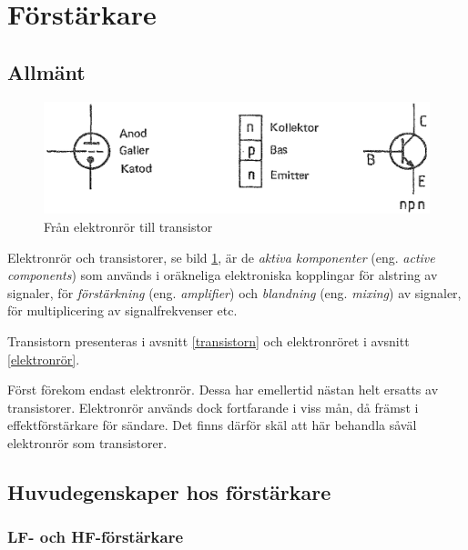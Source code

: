 \section{Förstärkare}

\subsection{Allmänt}

\begin{figure}
\includegraphics[width=\textwidth]{images/cropped_pdfs/bild_2_3-40.pdf}
\caption{Från elektronrör till transistor}
\label{fig:BildII3-40}
\end{figure}

Elektronrör och transistorer, se bild \ref{fig:BildII3-40}, är de
\emph{aktiva komponenter} (eng. \emph{active components}) som används i
oräkneliga elektroniska kopplingar för alstring av signaler, för
\emph{förstärkning} (eng. \emph{amplifier}) och \emph{blandning} (eng.
\emph{mixing}) av signaler, för multiplicering av signalfrekvenser etc.

Transistorn presenteras i avsnitt \ref{transistorn} och elektronröret i avsnitt \ref{elektronrör}.

Först förekom endast elektronrör.
Dessa har emellertid nästan helt ersatts av transistorer.
Elektronrör används dock fortfarande i viss mån, då främst i effektförstärkare
för sändare.
Det finns därför skäl att här behandla såväl elektronrör som transistorer.

\subsection{Huvudegenskaper hos förstärkare}
\subsubsection{LF- och HF-förstärkare}

